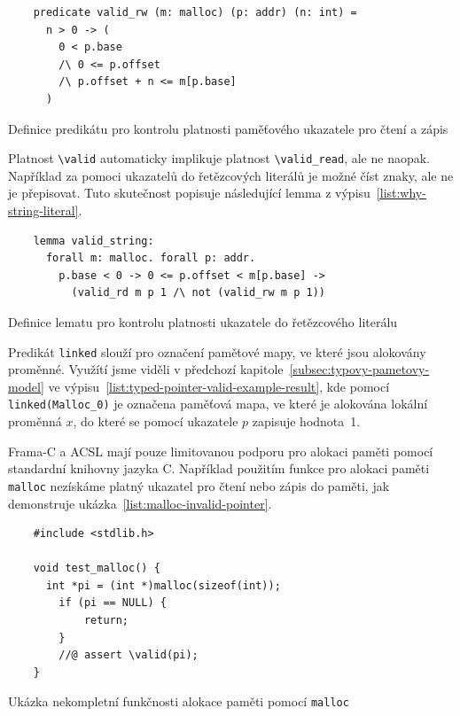 \begin{listing}[H]
    \begin{verbatim}
    predicate valid_rw (m: malloc) (p: addr) (n: int) =
      n > 0 -> (
        0 < p.base
        /\ 0 <= p.offset
        /\ p.offset + n <= m[p.base]
      )
    \end{verbatim}
    \caption{Definice predikátu pro kontrolu platnosti paměťového ukazatele pro čtení a zápis}
    \label{list:why-pointer-valid}
\end{listing}

Platnost \texttt{\textbackslash valid} automaticky implikuje platnost \texttt{\textbackslash valid\_read},
ale ne naopak.
Například za pomoci ukazatelů do řetězcových literálů je možné číst znaky,
ale ne je přepisovat.
Tuto skutečnost popisuje následující lemma z výpisu~\ref{list:why-string-literal}.

\begin{listing}[H]
    \begin{verbatim}
    lemma valid_string:
      forall m: malloc. forall p: addr.
        p.base < 0 -> 0 <= p.offset < m[p.base] ->
          (valid_rd m p 1 /\ not (valid_rw m p 1))
    \end{verbatim}
    \caption{Definice lematu pro kontrolu platnosti ukazatele do řetězcového literálu}
    \label{list:why-string-literal}
\end{listing}

Predikát \texttt{linked} slouží pro označení pamětové mapy,
ve které jsou alokovány proměnné.
Využítí jsme viděli v předchozí kapitole~\ref{subsec:typovy-pametovy-model}
ve výpisu~\ref{list:typed-pointer-valid-example-result}, kde pomocí
\texttt{linked(Malloc\_0)} je označena paměťová mapa,
ve které je alokována lokální proměnná $x$,
do které se pomocí ukazatele $p$ zapisuje hodnota~1.

Frama\mbox{-}C a ACSL mají pouze limitovanou podporu pro alokaci paměti pomocí standardní knihovny jazyka C.
Například použitím funkce pro alokaci paměti \texttt{malloc} nezískáme platný ukazatel pro čtení nebo zápis do paměti,
jak demonstruje ukázka~\ref{list:malloc-invalid-pointer}.

\begin{listing}[H]
    \begin{verbatim}
    #include <stdlib.h>

    void test_malloc() {
      int *pi = (int *)malloc(sizeof(int));
        if (pi == NULL) {
            return;
        }
        //@ assert \valid(pi);
    }
    \end{verbatim}
    \caption{Ukázka nekompletní funkčnosti alokace paměti pomocí \texttt{malloc}}
    \label{list:malloc-invalid-pointer}
\end{listing}

